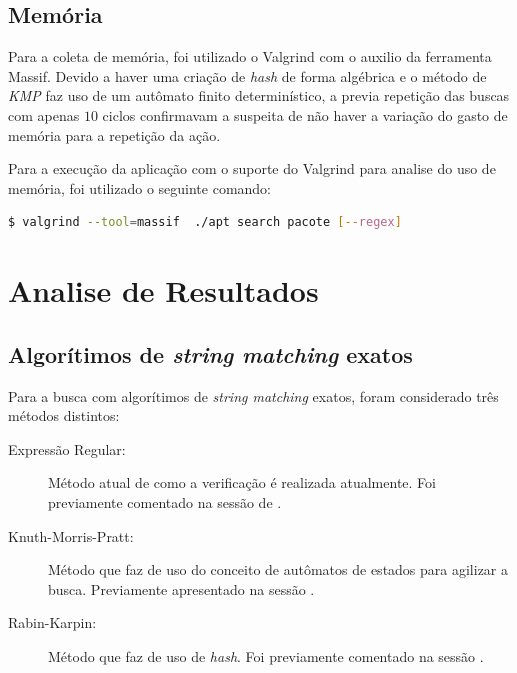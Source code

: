 \section{Memória}

Para a coleta de memória, foi utilizado o {\code Valgrind} com o auxilio da ferramenta {\code Massif}. Devido a haver uma criação de \textit{hash} de forma  algébrica e o método de \textit{KMP} faz uso de um autômato finito determinístico, a previa repetição das buscas com apenas $10$ ciclos confirmavam a suspeita de não haver a variação do gasto de memória para a repetição da ação.

Para a execução da aplicação com o suporte do {\code Valgrind} para analise do uso de memória, foi utilizado o seguinte comando:

\begin{lstlisting}[language=Bash,label=valgrind_call, numbers=none]
   $ valgrind --tool=massif  ./apt search pacote [--regex]
\end{lstlisting}


\chapter{Analise de Resultados} %
\label{cha:analise_de_resultados}

\section{Algorítimos de \textit{string matching} exatos} %
\label{sec:algor_timos_de_string_matching_exatos}

Para a busca com algorítimos de \textit{string matching} exatos, foram considerado três métodos distintos:

\begin{description}
	\item[Expressão Regular:] Método atual de como a verificação é realizada atualmente. Foi previamente comentado na sessão de .
	\item[Knuth-Morris-Pratt:] Método que faz de uso do conceito de autômatos de estados para agilizar a busca. Previamente apresentado na sessão .
	\item[Rabin-Karpin:]  Método que faz de uso de \textit{hash}. Foi previamente comentado na sessão .
\end{description}

